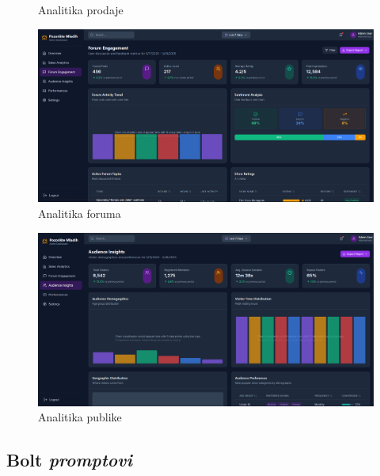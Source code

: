 \begin{itemize}
\begin{figure}[H]
        \caption{Analitika prodaje}
        \label{fig:fz10_2}
    \end{figure}
    \begin{figure}[H]
        \centering
        \includegraphics[width=1\linewidth]{Slike/FZ10/fz10_3.png}
        \caption{Analitika foruma}
        \label{fig:fz10_3}
    \end{figure}
    \begin{figure}[H]
        \centering
        \includegraphics[width=1\linewidth]{Slike/FZ10/fz10_4.png}
        \caption{Analitika publike}
        \label{fig:fz10_4}
    \end{figure}
\end{itemize}  

\sloppy  
\subsection{Bolt \textit{promptovi}}

